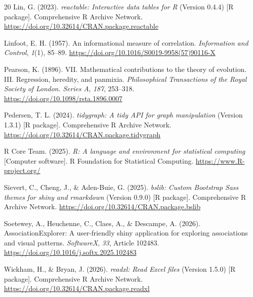 \documentclass[11pt]{article}
\newcommand{\pkg}[1]{\textsf{#1}}
\newcommand{\proglang}[1]{\textsf{#1}}
\newcommand{\doi}[1]{\href{https://doi.org/#1}{https://doi.org/#1}}
\begin{document}
\begin{thebibliography}{20}
Lin, G. (2023).
\newblock \emph{\pkg{reactable}: Interactive data tables for \proglang{R}}
(Version 0.4.4) [\proglang{R} package].
\newblock Comprehensive \proglang{R} Archive Network. \doi{10.32614/CRAN.package.reactable}

Linfoot, E. H. (1957).
\newblock An informational measure of correlation.
\newblock \emph{Information and Control}, \emph{1}(1), 85--89. \doi{10.1016/S0019-9958(57)90116-X}

Pearson, K. (1896).
\newblock VII. Mathematical contributions to the theory of evolution. III.
Regression, heredity, and panmixia.
\newblock \emph{Philosophical Transactions of the Royal Society of London.
Series A}, \emph{187}, 253--318. \doi{10.1098/rsta.1896.0007}

Pedersen, T. L. (2024).
\newblock \emph{\pkg{tidygraph}: A tidy API for graph manipulation} (Version
1.3.1) [\proglang{R} package].
\newblock Comprehensive \proglang{R} Archive Network. \doi{10.32614/CRAN.package.tidygraph}

\bibitem[{\proglang{R} Core Team}(2025)]{R}
{\proglang{R} Core Team}. (2025).
\newblock \emph{\proglang{R}: A language and environment for statistical
computing} [Computer software].
\newblock \proglang{R} Foundation for Statistical Computing. \url{https://www.R-project.org/}

Sievert, C., Cheng, J., \& Aden-Buie, G. (2025).
\newblock \emph{\pkg{bslib}: Custom Bootstrap Sass themes for \pkg{shiny} and
\pkg{rmarkdown}} (Version 0.9.0) [\proglang{R} package].
\newblock Comprehensive \proglang{R} Archive Network. \doi{10.32614/CRAN.package.bslib}

Soetewey, A., Heuchenne, C., Claes, A., \& Descampe, A. (2026).
\newblock AssociationExplorer: A user-friendly \pkg{shiny} application for
exploring associations and visual patterns.
\newblock \emph{SoftwareX}, \emph{33}, Article 102483. \doi{10.1016/j.softx.2025.102483}

Wickham, H., \& Bryan, J. (2026).
\newblock \emph{\pkg{readxl}: Read Excel files} (Version 1.5.0)
[\proglang{R} package].
\newblock Comprehensive \proglang{R} Archive Network. \doi{10.32614/CRAN.package.readxl}

\end{thebibliography}
\end{document}
